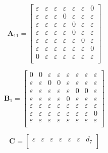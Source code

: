 \documentclass[11pt, a4paper, fleqn]{article}
\begin{document}
\begin{equation*}
\mathbf{A}_{11} = 
\left[\begin{array}{ ccccccc }
\varepsilon	&\varepsilon	&\varepsilon	&\varepsilon	&\varepsilon	&\varepsilon	&0\\
\varepsilon	&\varepsilon	&\varepsilon	&0	&\varepsilon	&\varepsilon	&\varepsilon\\
\varepsilon	&\varepsilon	&\varepsilon	&\varepsilon	&0	&\varepsilon	&\varepsilon\\
\varepsilon	&\varepsilon	&\varepsilon	&\varepsilon	&0	&\varepsilon	&\varepsilon\\
\varepsilon	&\varepsilon	&\varepsilon	&\varepsilon	&\varepsilon	&0	&\varepsilon\\
\varepsilon	&\varepsilon	&\varepsilon	&\varepsilon	&\varepsilon	&\varepsilon	&0\\
0	&\varepsilon	&\varepsilon	&\varepsilon	&\varepsilon	&\varepsilon	&\varepsilon\\
\end{array}\right]
\end{equation*}

\begin{equation*}
\mathbf{B}_{1} = 
\left[\begin{array}{ cccccccc }
0	&0	&\varepsilon	&\varepsilon	&\varepsilon	&\varepsilon	&\varepsilon	&\varepsilon\\
\varepsilon	&\varepsilon	&0	&0	&\varepsilon	&\varepsilon	&\varepsilon	&\varepsilon\\
\varepsilon	&\varepsilon	&\varepsilon	&\varepsilon	&\varepsilon	&0	&0	&\varepsilon\\
\varepsilon	&\varepsilon	&\varepsilon	&\varepsilon	&0	&\varepsilon	&\varepsilon	&\varepsilon\\
\varepsilon	&\varepsilon	&\varepsilon	&\varepsilon	&\varepsilon	&\varepsilon	&\varepsilon	&\varepsilon\\
\varepsilon	&\varepsilon	&\varepsilon	&\varepsilon	&\varepsilon	&\varepsilon	&\varepsilon	&0\\
\varepsilon	&\varepsilon	&\varepsilon	&\varepsilon	&\varepsilon	&\varepsilon	&\varepsilon	&\varepsilon\\
\end{array}\right]
\end{equation*}

\begin{equation*}
\mathbf{C}_{{}} = 
\left[\begin{array}{ ccccccc }
\varepsilon	&\varepsilon	&\varepsilon	&\varepsilon	&\varepsilon	&\varepsilon	&d_7\\
\end{array}\right]
\end{equation*}
\end{document}
